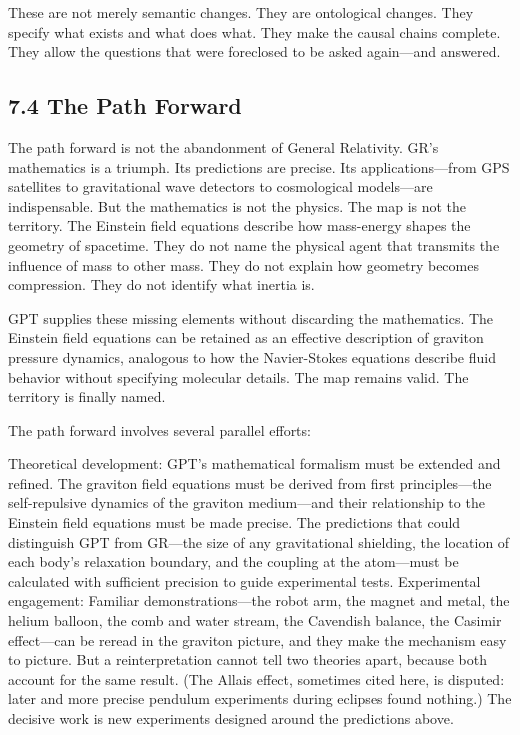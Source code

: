 \documentclass[11pt]{article}
\begin{document}
These are not merely semantic changes. They are ontological changes. They specify what exists and what does what. They make the causal chains complete. They allow the questions that were foreclosed to be asked again---and answered.

\subsection{7.4 The Path Forward}

The path forward is not the abandonment of General Relativity. GR's mathematics is a triumph. Its predictions are precise. Its applications---from GPS satellites to gravitational wave detectors to cosmological models---are indispensable. But the mathematics is not the physics. The map is not the territory. The Einstein field equations describe how mass-energy shapes the geometry of spacetime. They do not name the physical agent that transmits the influence of mass to other mass. They do not explain how geometry becomes compression. They do not identify what inertia is.

GPT supplies these missing elements without discarding the mathematics. The Einstein field equations can be retained as an effective description of graviton pressure dynamics, analogous to how the Navier-Stokes equations describe fluid behavior without specifying molecular details. The map remains valid. The territory is finally named.

The path forward involves several parallel efforts:

Theoretical development: GPT's mathematical formalism must be extended and refined. The graviton field equations must be derived from first principles---the self-repulsive dynamics of the graviton medium---and their relationship to the Einstein field equations must be made precise. The predictions that could distinguish GPT from GR---the size of any gravitational shielding, the location of each body's relaxation boundary, and the coupling at the atom---must be calculated with sufficient precision to guide experimental tests. Experimental engagement: Familiar demonstrations---the robot arm, the magnet and metal, the helium balloon, the comb and water stream, the Cavendish balance, the Casimir effect---can be reread in the graviton picture, and they make the mechanism easy to picture. But a reinterpretation cannot tell two theories apart, because both account for the same result. (The Allais effect, sometimes cited here, is disputed: later and more precise pendulum experiments during eclipses found nothing.) The decisive work is new experiments designed around the predictions above.
\end{document}
